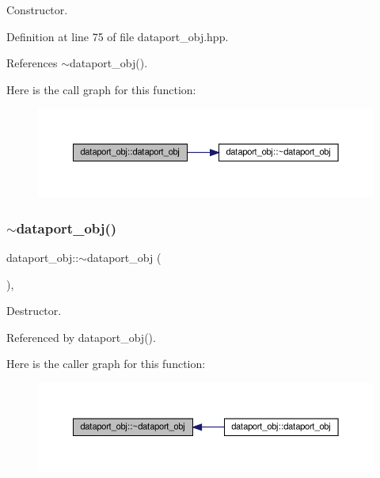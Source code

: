 Constructor. 



Definition at line 75 of file dataport\+\_\+obj.\+hpp.



References $\sim$dataport\+\_\+obj().

Here is the call graph for this function\+:
\nopagebreak
\begin{figure}[H]
\begin{center}
\leavevmode
\includegraphics[width=350pt]{d4/d03/classdataport__obj_a609a5d2e03e127a315b939503c636c82_cgraph}
\end{center}
\end{figure}
\mbox{\label{classdataport__obj_ae77f5ac9cafd1d26f75e4c1c1b9c39db}} 
\subsubsection{\texorpdfstring{$\sim$dataport\+\_\+obj()}{~dataport\_obj()}}
{\footnotesize\ttfamily dataport\+\_\+obj\+::$\sim$dataport\+\_\+obj (\begin{DoxyParamCaption}{ }\end{DoxyParamCaption})\hspace{0.3cm}{\ttfamily [override]}, {\ttfamily [default]}}



Destructor. 



Referenced by dataport\+\_\+obj().

Here is the caller graph for this function\+:
\nopagebreak
\begin{figure}[H]
\begin{center}
\leavevmode
\includegraphics[width=350pt]{d4/d03/classdataport__obj_ae77f5ac9cafd1d26f75e4c1c1b9c39db_icgraph}
\end{center}
\end{figure}


